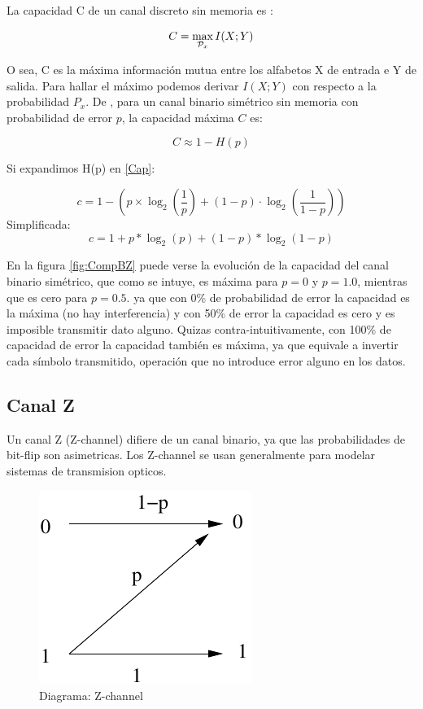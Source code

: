 La capacidad C de un canal discreto sin memoria es :

\begin{equation}
C = \max_{{\cal{P}}_x} I(X;Y) 
\end{equation}

O sea, C es la máxima información mutua entre los alfabetos X de entrada e Y de salida.
Para hallar el máximo podemos derivar $I(X;Y)$ con respecto a la probabilidad $P_x$.
De \cite{MacKay:2002}, para un canal binario simétrico sin memoria con probabilidad de error $p$, la capacidad máxima $C$ es:

\begin{equation}\label{Cap}
C \approx 1 - H(p) 
\end{equation}

Si expandimos H(p) en \ref{Cap}:

$$ c = 1-\left(p \times \log_2\left(\frac{1}{p}\right) + (1-p) \cdot \log_2\left(\frac{1}{1-p}\right)\right) $$
Simplificada:
$$ c = 1 + p * \log_2(p) + (1 - p) * \log_2(1-p) $$

En la figura \ref{fig:CompBZ} puede verse la evolución de la capacidad del canal binario simétrico, que como se intuye, es máxima para $p=0$ y $p=1.0$, mientras que es cero para $p=0.5$. ya que con 0\% de probabilidad de error la capacidad es la máxima (no hay interferencia) y con 50\% de error la capacidad es cero y es imposible transmitir dato alguno. Quizas contra-intuitivamente, con 100\% de capacidad de error la capacidad también es máxima, ya que equivale a invertir cada símbolo transmitido, operación que no introduce error alguno en los datos.


\subsection{Canal Z}
Un canal Z (Z-channel) difiere de un canal binario, ya que las probabilidades de bit-flip son asimetricas.
Los Z-channel se usan generalmente para modelar sistemas de transmision opticos.

\begin{figure}[th]
  \begin{center}
    \includegraphics[scale=0.5]{capacidad/zchannel}
  \end{center}
  \caption{Diagrama: Z-channel}
  \label{fig:Gal}
\end{figure}

